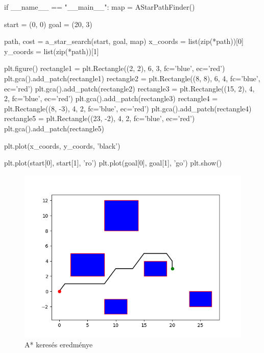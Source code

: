\begin{python}
if __name__ == "__main__":
    map = AStarPathFinder()

    start = (0, 0)
    goal = (20, 3)

    path, cost = a_star_search(start, goal, map)
    x_coords = list(zip(*path))[0]
    y_coords = list(zip(*path))[1]
    
    plt.figure()
    rectangle1 = plt.Rectangle((2, 2), 6, 3, fc='blue', ec='red')
    plt.gca().add_patch(rectangle1)
    rectangle2 = plt.Rectangle((8, 8), 6, 4, fc='blue', ec='red')
    plt.gca().add_patch(rectangle2)
    rectangle3 = plt.Rectangle((15, 2), 4, 2, fc='blue', ec='red')
    plt.gca().add_patch(rectangle3)
    rectangle4 = plt.Rectangle((8, -3), 4, 2, fc='blue', ec='red')
    plt.gca().add_patch(rectangle4)
    rectangle5 = plt.Rectangle((23, -2), 4, 2, fc='blue', ec='red')
    plt.gca().add_patch(rectangle5)
    
    plt.plot(x_coords, y_coords, 'black')

    plt.plot(start[0], start[1], 'ro')
    plt.plot(goal[0], goal[1], 'go')
    plt.show()
\end{python}


\begin{figure}[h!]
\centering
\includegraphics[scale=0.75]{images/a_star.png}
\caption{A* keresés eredménye}
\label{fig:a_star}
\end{figure}

\newpage


